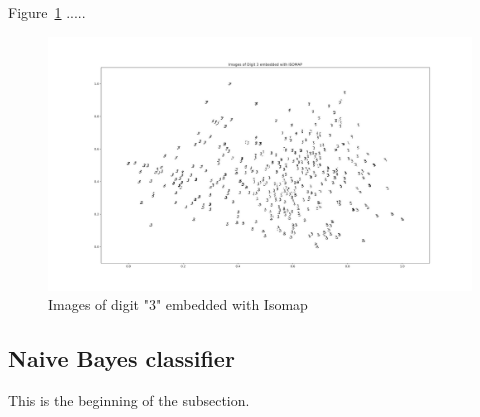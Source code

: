 Figure~\ref{fig:fig10} .....
\begin{figure}[htb]
 \centering
\includegraphics[width=\textwidth]{assignment1/3-2-ISOMAPembedding.png}
\caption{\label{fig:fig10}Images of digit "3" embedded with Isomap}
\end{figure}

\clearpage{}
\subsection{Naive Bayes classifier}

This is the beginning of the subsection.

